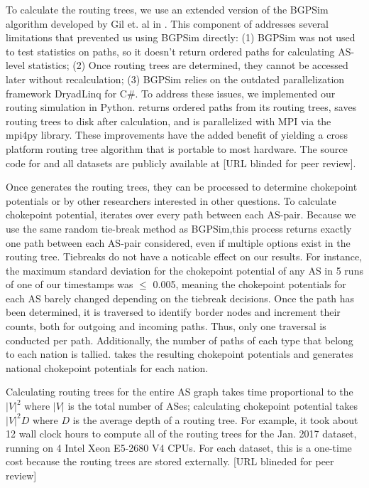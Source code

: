 \par To calculate the routing trees, we use an extended version of the
BGPSim algorithm developed by Gil et. al in \cite{quicksand}. This
component of \toolname{} addresses several limitations that prevented
us using BGPSim directly: (1) BGPSim was not used to test statistics on paths, so it
doesn't return ordered paths for calculating AS-level statistics; (2)
Once routing trees are determined, they cannot be accessed later
without recalculation; (3) BGPSim relies on the outdated
parallelization framework DryadLinq for C\#. To address these issues,
we implemented our routing simulation in
Python. \toolname{} returns
ordered paths from its routing trees, saves routing trees to disk
after calculation, and is parallelized with MPI via the mpi4py
library. These improvements have the added benefit of yielding a cross
platform routing tree algorithm that is portable to most
hardware. The source code for \toolname{} and all datasets are publicly available at [URL blinded for peer review].


\par Once \toolname{} generates the routing trees, they can be processed to
determine chokepoint potentials or by other researchers interested in other questions. To calculate chokepoint potential, \toolname{} iterates over every path
between each AS-pair. Because we use the same random tie-break method as BGPSim,this process returns 
exactly one path between each AS-pair considered, even if multiple options exist in the
routing tree. Tiebreaks do not have a noticable effect on our results. For instance, the maximum
standard deviation for the chokepoint potential of any AS in 5 runs of one of our timestamps was 
$\leq$ 0.005, meaning the chokepoint potentials for each AS barely changed depending on the tiebreak
decisions.
Once the path has been determined, it is traversed to identify border nodes and increment their counts, both
for outgoing and incoming paths.  Thus, only one traversal is conducted
per path. Additionally, the number of paths of each type that belong to each
nation is tallied. \toolname{} takes the resulting chokepoint
potentials and generates national chokepoint potentials for each nation.

Calculating routing trees for the entire AS graph takes time proportional to the $|V|^2$ where $|V|$ is the total number of ASes; calculating chokepoint potential takes $|V|^2D$ where $D$ is the average depth of a routing tree. For example,
it took about 12 wall clock hours to compute all of the routing trees for the Jan. 2017 dataset, running on 4 Intel Xeon E5-2680 V4 CPUs.  For each dataset, this is a one-time cost because the routing trees are stored externally.  [URL blineded for peer review] 
